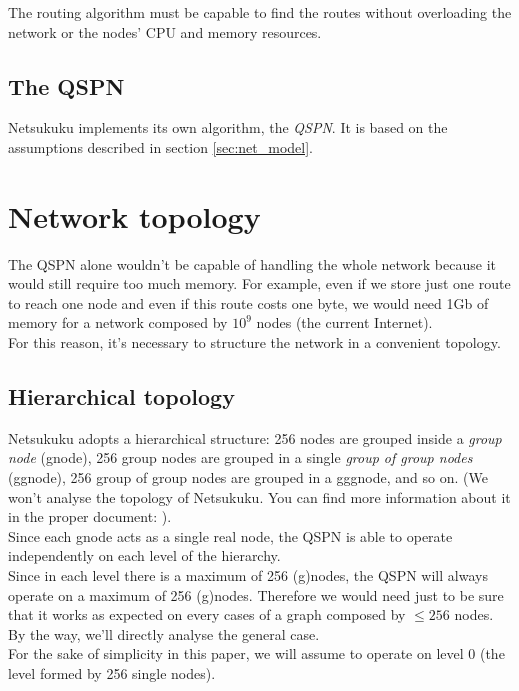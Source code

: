 \documentclass[a4paper]{article}
\begin{document}
The routing algorithm must be capable to find the routes without overloading
the network or the nodes' CPU and memory resources.

\subsection{The QSPN}

Netsukuku implements its own algorithm, the \emph{QSPN}.
It is based on the assumptions described in section \ref{sec:net_model}.

\section{Network topology}
\label{sec:net_topology}

The QSPN alone wouldn't be capable of handling the whole network because it
would still require too much memory. For example, even if we store just one
route to reach one node and even if this route costs one byte, we would need
1Gb of memory for a network composed by $10^9$ nodes (the current Internet).\\

For this reason, it's necessary to structure the network in a convenient
topology.

\subsection{Hierarchical topology}
\label{sec:fractal_topology}
Netsukuku adopts a hierarchical structure:
256 nodes are grouped inside a \emph{group node} (gnode), 256 group nodes are grouped
in a single \emph{group of group nodes} (ggnode), 256 group of group nodes are
grouped in a gggnode, and so on. (We won't analyse the topology of Netsukuku. You 
can find more information about it in the proper document: \cite{ntktopology}).\\

Since each gnode acts as a single real node, the QSPN is able to operate independently
on each level of the hierarchy.\\

Since in each level there is a maximum of 256 (g)nodes, the QSPN will
always operate on a maximum of 256 (g)nodes. Therefore we would need just to
be sure that it works as expected on every cases of a graph composed by $\le
256$ nodes. By the way, we'll directly analyse the general case.\\

For the sake of simplicity in this paper, we will assume to operate on level
0 (the level formed by 256 single nodes).
\end{document}
